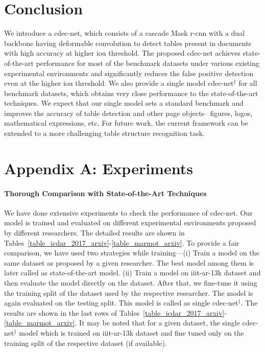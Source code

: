 \documentclass[a4paper,conference]{IEEEtran}
\begin{document}
\section{Conclusion} \label{conclusion}

We introduce a {\sc cd}e{\sc c}-{\sc n}et, which consists of a cascade Mask {\sc r-cnn} with a dual backbone having deformable convolution to detect tables present in documents with high accuracy at higher {\sc i}o{\sc u} threshold. The proposed {\sc cd}e{\sc c-n}et achieves state-of-the-art performance for most of the benchmark datasets under various existing experimental environments and significantly reduces the false positive detection even at the higher {\sc i}o{\sc u} threshold. We also provide a single model {\sc cd}e{\sc c}-{\sc n}et$^{\ddagger}$ for all benchmark datasets, which obtains very close performance to the state-of-the-art techniques. We expect that our single model sets a standard benchmark and improves the accuracy of table detection and other page objects-- figures, logos, mathematical expressions, etc. For future work, the current framework can be extended to a more challenging table structure recognition task. 




\section*{Appendix A: Experiments}

\paragraph*{\textbf{Thorough Comparison with State-of-the-Art Techniques}}

We have done extensive experiments to check the performance of {\sc cd}e{\sc c-n}et. Our model is trained and evaluated on different experimental environments proposed by different researchers. The detailed results are shown in Tables~\ref{table_icdar_2017_arxiv}-\ref{table_marmot_arxiv}. To provide a fair comparison, we have used two strategies while training---(i) Train a model on the same dataset as proposed by a given researcher. The best model among them is later called as state-of-the-art model. (ii) Train a model on {\sc iiit-ar-13k} dataset and then evaluate the model directly on the dataset. After that, we fine-tune it using the training split of the dataset used by the respective researcher. The model is again evaluated on the testing split. This model is called as single {\sc cd}e{\sc c-n}et$^{\ddagger}$. The results are shown in the last rows of Tables~\ref{table_icdar_2017_arxiv}-\ref{table_marmot_arxiv}. It may be noted that for a given dataset, the single {\sc cd}e{\sc c-n}et$^{\ddagger}$ model which is trained on {\sc iiit-ar-13k} dataset and fine tuned only on the training split of the respective dataset (if available). 
\end{document}
